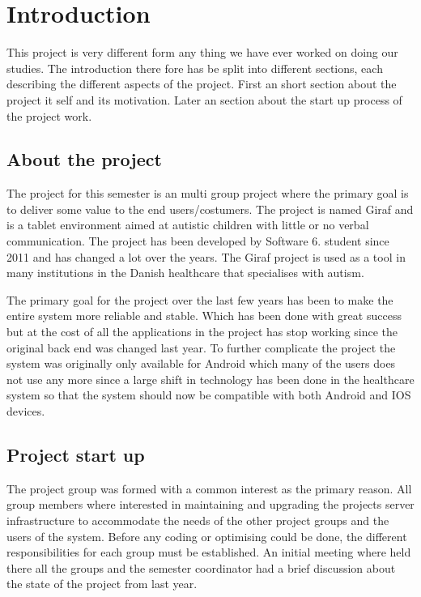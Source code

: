 \chapter{Introduction}
This project is very different form any thing we have ever worked on doing our studies. 
The introduction there fore has be split into different sections, each describing the different aspects of the project. 
First an short section about the project it self and its motivation. 
Later an section about the start up process of the project work. 

\section{About the project}
The project for this semester is an multi group project where the primary goal is to deliver some value to the end users/costumers. 
The project is named Giraf and is a tablet environment aimed at autistic children with little or no verbal communication.
The project has been developed by Software 6. student since 2011 and has changed a lot over the years. 
The Giraf project is used as a tool in many institutions in the Danish healthcare that specialises with autism. 

The primary goal for the project over the last few years has been to make the entire system more reliable and stable. 
Which has been done with great success but at the cost of all the applications in the project has stop working since the original back end was changed last year. 
To further complicate the project the system was originally only available for Android which many of the users does not use any more since a large shift in technology has been done in the healthcare system so that the system should now be compatible with both Android and IOS devices. 


\section{Project start up}
The project group was formed with a common interest as the primary reason. 
All group members where interested in maintaining and upgrading the projects server infrastructure to accommodate the needs of the other project groups and the users of the system. 
Before any coding or optimising could be done, the different responsibilities for each group must be established. 
An initial meeting where held there all the groups and the semester coordinator had a brief discussion about the state of the project from last year. 

